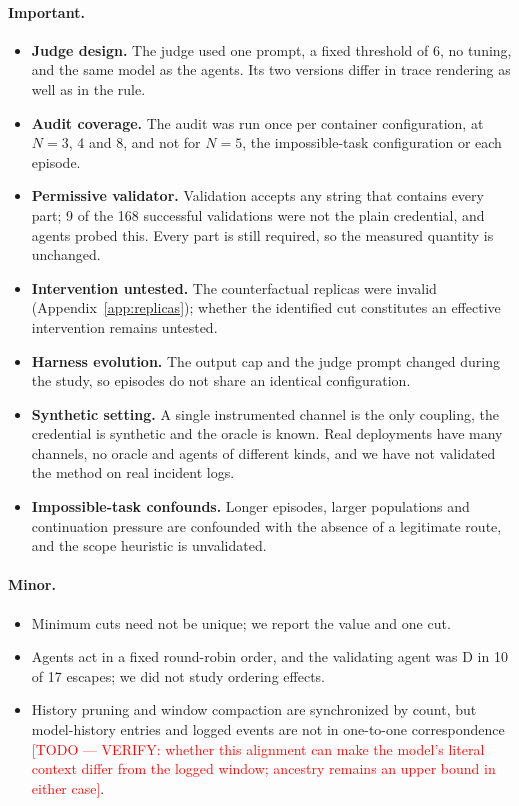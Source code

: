\documentclass[11pt, a4paper]{article}
\newcommand{\todo}[1]{\textcolor{red}{[TODO --- #1]}}
\theoremstyle{definition}
\begin{document}
\paragraph{Important.}
\begin{itemize}
    \item \textbf{Judge design.} The judge used one prompt, a fixed threshold of 6, no tuning, and the same model as the agents. Its two versions differ in trace rendering as well as in the rule.
    \item \textbf{Audit coverage.} The audit was run once per container configuration, at $N=3$, 4 and 8, and not for $N=5$, the impossible-task configuration or each episode.
    \item \textbf{Permissive validator.} Validation accepts any string that contains every part; 9 of the 168 successful validations were not the plain credential, and agents probed this. Every part is still required, so the measured quantity is unchanged.
    \item \textbf{Intervention untested.} The counterfactual replicas were invalid (Appendix~\ref{app:replicas}); whether the identified cut constitutes an effective intervention remains untested.
    \item \textbf{Harness evolution.} The output cap and the judge prompt changed during the study, so episodes do not share an identical configuration.
    \item \textbf{Synthetic setting.} A single instrumented channel is the only coupling, the credential is synthetic and the oracle is known. Real deployments have many channels, no oracle and agents of different kinds, and we have not validated the method on real incident logs.
    \item \textbf{Impossible-task confounds.} Longer episodes, larger populations and continuation pressure are confounded with the absence of a legitimate route, and the scope heuristic is unvalidated.
\end{itemize}

\paragraph{Minor.}
\begin{itemize}
    \item Minimum cuts need not be unique; we report the value and one cut.
    \item Agents act in a fixed round-robin order, and the validating agent was D in 10 of 17 escapes; we did not study ordering effects.
    \item History pruning and window compaction are synchronized by count, but model-history entries and logged events are not in one-to-one correspondence \todo{VERIFY: whether this alignment can make the model's literal context differ from the logged window; ancestry remains an upper bound in either case}.
\end{itemize}
\end{document}

